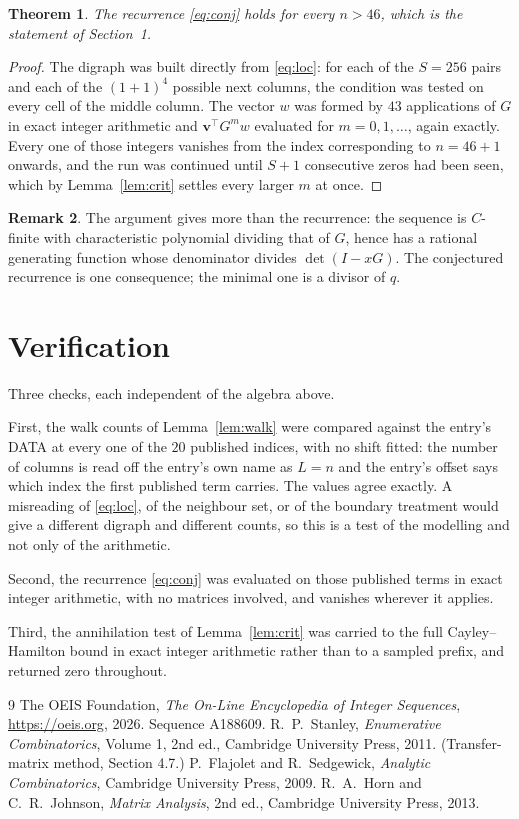 \documentclass[11pt,a4paper]{article}
\theoremstyle{plain}
\newtheorem{theorem}{Theorem}
\theoremstyle{definition}
\newtheorem{remark}[theorem]{Remark}
\begin{document}
\begin{theorem}
The recurrence \eqref{eq:conj} holds for every $n>46$, which is the statement of
Section~1.
\end{theorem}

\begin{proof}
The digraph was built directly from \eqref{eq:loc}: for each of the $S=256$ pairs and each
of the $(1+1)^{4}$ possible next columns, the condition was tested on every cell of
the middle column. The vector $w$ was formed by $43$ applications of $G$ in exact integer
arithmetic and $\mathbf{v}^{\!\top}G^{m}w$ evaluated for $m=0,1,\dots$, again exactly.
Every one of those integers vanishes from the index corresponding to $n=46+1$ onwards,
and the run was continued until $S+1$ consecutive zeros had been seen, which by
Lemma~\ref{lem:crit} settles every larger $m$ at once.
\end{proof}

\begin{remark}
The argument gives more than the recurrence: the sequence is $C$-finite with characteristic
polynomial dividing that of $G$, hence has a rational generating function whose denominator
divides $\det(I-xG)$. The conjectured recurrence is one consequence; the minimal one is a
divisor of $q$.
\end{remark}

\section{Verification}

Three checks, each independent of the algebra above.

First, the walk counts of Lemma~\ref{lem:walk} were compared against the entry's DATA at
every one of the $20$ published indices, with no shift fitted: the number of columns is
read off the entry's own name as $L=n$ and the entry's offset says which index the first
published term carries. The values agree exactly. A misreading of \eqref{eq:loc}, of the
neighbour set, or of the boundary treatment would give a different digraph and different
counts, so this is a test of the modelling and not only of the arithmetic.

Second, the recurrence \eqref{eq:conj} was evaluated on those published terms in exact
integer arithmetic, with no matrices involved, and vanishes wherever it applies.

Third, the annihilation test of Lemma~\ref{lem:crit} was carried to the full
Cayley--Hamilton bound in exact integer arithmetic rather than to a sampled prefix, and
returned zero throughout.

\begin{thebibliography}{9}
 The OEIS Foundation, \emph{The On-Line Encyclopedia of Integer
Sequences}, \url{https://oeis.org}, 2026. Sequence A188609.
 R.~P.~Stanley, \emph{Enumerative Combinatorics}, Volume 1, 2nd ed.,
Cambridge University Press, 2011. (Transfer-matrix method, Section 4.7.)
 P.~Flajolet and R.~Sedgewick, \emph{Analytic Combinatorics}, Cambridge
University Press, 2009.
 R.~A.~Horn and C.~R.~Johnson, \emph{Matrix Analysis}, 2nd ed., Cambridge
University Press, 2013.
\end{thebibliography}
\end{document}

